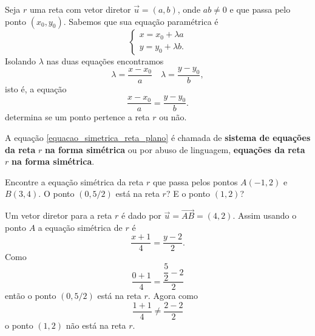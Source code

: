 Seja $r$ uma reta com vetor diretor $\vec{u} = (a,b)$, onde $ab\ne 0$ e que passa pelo ponto $(x_0, y_0)$. Sabemos que sua equa\c{c}\~ao param\'etrica \'e
\[
  \begin{cases}
    x = x_0 + \lambda a\\
    y = y_0 + \lambda b.
  \end{cases}
\]
Isolando $\lambda$ nas duas equa\c{c}\~oes encontramos
\[
  \lambda = \dfrac{x - x_0}{a}\quad \lambda = \dfrac{y - y_0}{b},
\]
isto \'e, a equa\c{c}\~ao
\begin{equation}\label{equacao_simetrica_reta_plano}
  \dfrac{x - x_0}{a} = \dfrac{y - y_0}{b}.
\end{equation}
determina se um ponto pertence a reta $r$ ou n\~ao.

\begin{definicao}
  A equa\c{c}\~ao \eqref{equacao_simetrica_reta_plano} \'e chamada de \textbf{sistema de equa\c{c}\~oes da reta} $r$ \textbf{na forma sim\'etrica} ou por abuso de linguagem, \textbf{equa\c{c}\~oes da reta} $r$ \textbf{na forma sim\'etrica}.
\end{definicao}

\begin{exemplos}
 Encontre a equa\c{c}\~ao sim\'etrica da reta $r$ que passa pelos pontos $A(-1,2)$ e $B(3,4)$. O ponto $(0,5/2)$ est\'a na reta $r$? E o ponto $(1,2)$?
 \begin{solucao}
   Um vetor diretor para a reta $r$ \'e dado por $\vec{u} = \vec{AB} = (4,2)$. Assim usando o ponto $A$ a equa\c{c}\~ao sim\'etrica de $r$ \'e
   \[
     \dfrac{x + 1}{4} = \dfrac{y - 2}{2}.
   \]
 Como
 \[
    \dfrac{0 + 1}{4} = \dfrac{\dfrac{5}{2} - 2}{2}
 \]
 ent\~ao o ponto $(0,5/2)$ est\'a na reta $r$. Agora como
 \[
  \dfrac{1+1}{4} \ne \dfrac{2 - 2}{2}
 \]
 o ponto $(1, 2)$ n\~ao est\'a na reta $r$.

 \end{solucao}
\end{exemplos}

